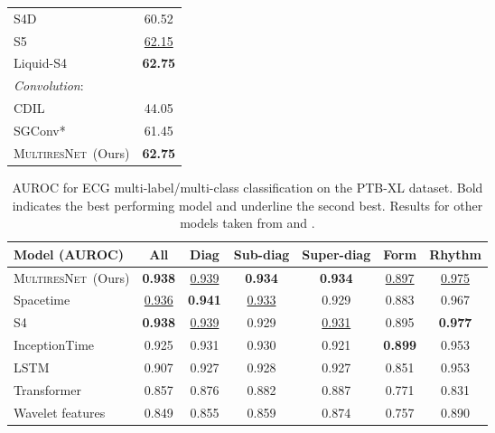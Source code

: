 \documentclass{article}
\theoremstyle{plain}
\theoremstyle{definition}
\theoremstyle{remark}
\newcommand{\ourmodel}{\textsc{MultiresNet}}
\begin{document}
\begin{table}[t]
\begin{small}
\begin{tabular}{lc}
    S4D \citep{guparameterization} & 60.52  \\
    S5 \citep{smith2022simplified} & \underline{62.15} \\
    Liquid-S4~\citep{hasani2022liquid} & \textbf{62.75}  \\
    \midrule
    \emph{Convolution}: & \\
    CDIL \citep{cheng2023classification} & 44.05 \\
    SGConv* \citep{li2022makes} & 61.45 \\
    \ourmodel\ (Ours) & \textbf{62.75} \\
    \bottomrule
\end{tabular}
    \end{small}
\end{table}

\begin{table*}[h]
    \vspace{-0.08in}
    \caption{AUROC for ECG multi-label/multi-class classification on the PTB-XL dataset. Bold indicates the
        best performing model and underline the second best. Results for other models taken from \citet{zhang2023effectively} and \citet{Strodthoff2021DeepLearningECG}.}
    \vskip 0.1in
    \centering
    \begin{small}
        \begin{tabular}{@{}lcccccc@{}}
            \toprule
            Model (AUROC) & All & Diag & Sub-diag & Super-diag & Form & Rhythm\\
            \midrule
            \ourmodel \ (Ours)& \textbf{0.938} & \underline{0.939} & \textbf{0.934} & \textbf{0.934} & \underline{0.897} & \underline{0.975} \\
            Spacetime \citep{zhang2023effectively} & \underline{0.936} & \textbf{0.941} & \underline{0.933} & 0.929 & 0.883 & 0.967 \\
            S4 \citep{gu2021efficiently} & \textbf{0.938} & \underline{0.939} & 0.929 & \underline{0.931} & 0.895 & \textbf{0.977} \\
            InceptionTime \citep{IsmailFawaz2020InceptionTimeFindingAlexNet} & 0.925 & 0.931 & 0.930 & 0.921 & \textbf{0.899} & 0.953 \\
            LSTM \citep{hochreiter1997long} & 0.907 & 0.927 & 0.928 & 0.927 & 0.851 & 0.953 \\
            Transformer \citep{vaswani2017attention} & 0.857 & 0.876 & 0.882 & 0.887 & 0.771 & 0.831 \\
            Wavelet features \citep{Strodthoff2021DeepLearningECG} & 0.849 & 0.855 & 0.859 & 0.874 & 0.757 & 0.890 \\
            \bottomrule
        \end{tabular}
        \label{tab:ptbxl}
    \end{small}
\end{table*}
\end{document}
